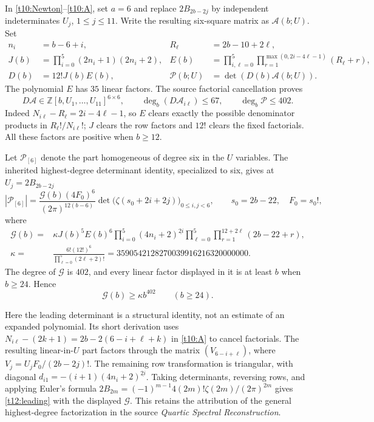 \documentclass[11pt,letterpaper]{article}
\numberwithin{equation}{section}
\theoremstyle{definition}
\theoremstyle{remark}
\begin{document}
In \eqref{t10:Newton}--\eqref{t10:A}, set $a=6$ and replace
$2B_{2b-2j}$ by independent indeterminates $U_j$, $1\le j\le11$.
Write the resulting six-square matrix as $\mathcal A(b;U)$. Set
\begin{align*}
 n_i&=b-6+i,&R_\ell&=2b-10+2\ell,\\
 J(b)&=\prod_{i=0}^5(2n_i+1)(2n_i+2),&
 E(b)&=\prod_{i,\ell=0}^5
       \prod_{r=1}^{\max(0,2i-4\ell-1)}(R_\ell+r),\\
 D(b)&=12!J(b)E(b),&
 \mathscr P(b;U)&=\det(D(b)\mathcal A(b;U)).
\end{align*}
The polynomial $E$ has $35$ linear factors. The source factorial
cancellation proves
\[
 D\mathcal A\in\mathbb Z[b,U_1,\ldots,U_{11}]^{6\times6},
 \qquad\deg_b(D\mathcal A_{i\ell})\le67,
 \qquad\deg_b\mathscr P\le402.
\]
Indeed $N_{i\ell}-R_\ell=2i-4\ell-1$, so $E$ clears exactly the
possible denominator products in $R_\ell!/N_{i\ell}!$;
$J$ clears the row factors and $12!$ clears the fixed factorials.
All these factors are positive when $b\ge12$.

Let $\mathscr P_{[6]}$ denote the part homogeneous of degree six in
the $U$ variables. The inherited highest-degree determinant identity,
specialized to six, gives at $U_j=2B_{2b-2j}$
\begin{equation}\label{t12:leading}
 \left|\mathscr P_{[6]}\right|
 =\frac{\mathcal G(b)(4F_0)^6}{(2\pi)^{12(b-6)}}
   \det\bigl(\zeta(s_0+2i+2j)\bigr)_{0\le i,j<6},
 \qquad s_0=2b-22,\quad F_0=s_0!,
\end{equation}
where
\begin{align*}
 \mathcal G(b)={}&\kappa J(b)^5E(b)^6
 \prod_{i=0}^5(4n_i+2)^{\underline{2i}}
 \prod_{\ell=0}^5\prod_{r=1}^{12+2\ell}(2b-22+r),\\
 \kappa={}&\frac{6!(12!)^6}{\prod_{\ell=0}^5(2\ell+2)!}
 =3590542128270039916216320000000.
\end{align*}
The degree of $\mathcal G$ is $402$, and every linear factor displayed
in it is at least $b$ when $b\ge24$. Hence
\begin{equation}\label{t12:Gbound}
 \mathcal G(b)\ge\kappa b^{402}\qquad(b\ge24).
\end{equation}

Here the leading determinant is a structural identity, not an estimate
of an expanded polynomial. Its short derivation uses
$N_{i\ell}-(2k+1)=2b-2(6-i+\ell+k)$ in \eqref{t10:A} to cancel
factorials. The resulting linear-in-$U$ part factors through the
matrix $(V_{6-i+\ell})$, where
$V_j=U_jF_0/(2b-2j)!$. The remaining row transformation is triangular,
with diagonal
$d_{i1}=-(i+1)(4n_i+2)^{\underline{2i}}$.
Taking determinants, reversing rows, and applying Euler's formula
$2B_{2m}=(-1)^{m-1}4(2m)!\zeta(2m)/(2\pi)^{2m}$ gives
\eqref{t12:leading} with the displayed $\mathcal G$. This retains the
attribution of the general highest-degree factorization in the source
\emph{Quartic Spectral Reconstruction}.
\end{document}
